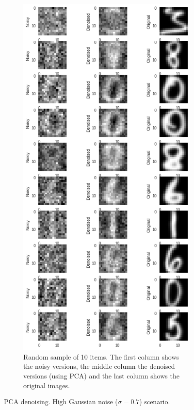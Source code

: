 \documentclass[a4paper,11pt]{article}
\begin{document}
\begin{figure}
\begin{subfigure}[t]{0.45\textwidth}
		\includegraphics[width=\textwidth]{images/assignment5-3-hgn2.png}
		\caption{Random sample of 10 items. The first column shows the noisy versions, the middle column the denoised versions (using PCA) and the last column shows the original images.}
		\label{fig:assignment5-3-hgn2}
	\end{subfigure}
	\caption{PCA denoising. High Gaussian noise ($\sigma=0.7$) scenario.}
	\label{fig:assignment5-3-hgn}
\end{figure}
\end{document}
